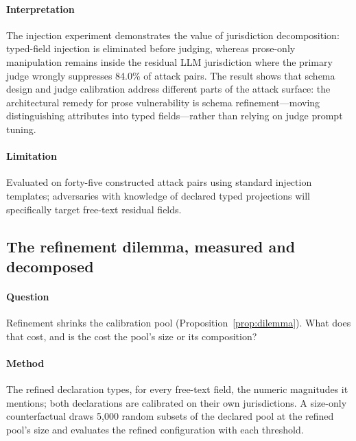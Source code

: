 

\paragraph{Interpretation} The injection experiment demonstrates the value of jurisdiction decomposition: typed-field injection is eliminated before judging, whereas prose-only manipulation remains inside the residual LLM jurisdiction where the primary judge wrongly suppresses 84.0\% of attack pairs. The result shows that schema design and judge calibration address different parts of the attack surface: the architectural remedy for prose vulnerability is schema refinement---moving distinguishing attributes into typed fields---rather than relying on judge prompt tuning.

\paragraph{Limitation} Evaluated on forty-five constructed attack pairs using standard injection templates; adversaries with knowledge of declared typed projections will specifically target free-text residual fields.

\subsection{The refinement dilemma, measured and decomposed}\label{sec:res-refinement}

\paragraph{Question} Refinement shrinks the calibration pool (Proposition~\ref{prop:dilemma}). What does that cost, and is the cost the pool's size or its composition?

\paragraph{Method} The refined declaration types, for every free-text field, the numeric magnitudes it mentions; both declarations are calibrated on their own jurisdictions. A size-only counterfactual draws 5,000 random subsets of the declared pool at the refined pool's size and evaluates the refined configuration with each threshold.

